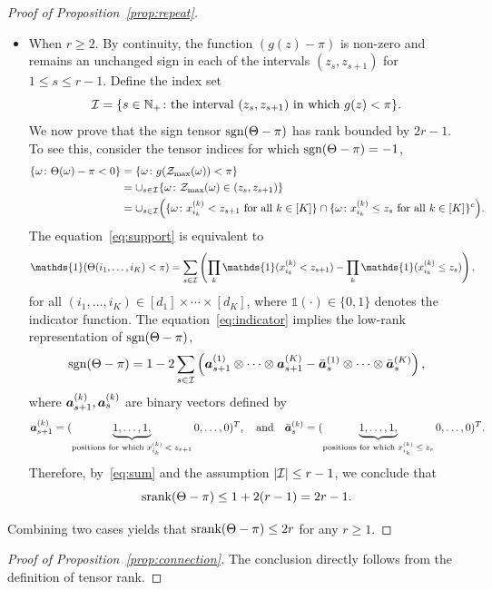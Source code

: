 \documentclass[twoside,11pt]{article}
\theoremstyle{plain}
\theoremstyle{definition}
\newcommand*{\KeepStyleUnderBrace}[1]{%
  \mathop{%
    \mathchoice
    {\underbrace{\displaystyle#1}}%
    {\underbrace{\textstyle#1}}%
    {\underbrace{\scriptstyle#1}}%
    {\underbrace{\scriptscriptstyle#1}}%
  }\limits
}
\def\sign{\textup{sgn}}
\def\srank{\textup{srank}}
\begin{document}
\begin{proof}[Proof of Proposition~\ref{prop:repeat}]
\begin{itemize}[leftmargin=*,topsep=0pt,itemsep=-1ex,partopsep=1ex,parsep=1ex]
\item When $r\geq 2$.   By continuity, the function $(g(z)-\pi)$ is non-zero and remains an unchanged sign in each of the intervals $(z_s, z_{s+1})$ for $1\leq s\leq r-1$. Define the index set 
\[
\mathcal{I}=\{s\in\mathbb{N}_{+}\colon \text{the interval $(z_s, z_{s+1})$ in which $g(z)<\pi$}\}.
\] 
We now prove that the sign tensor $\sign(\Theta-\pi)$ has rank bounded by $2r-1$. To see this, consider the tensor indices for which $\sign(\Theta-\pi)=-1$,
\begin{align}\label{eq:support}
\{\omega\colon \Theta(\omega)-\pi <0 \} & = \{\omega \colon g(\mathcal{Z}_{\max}(\omega))<\pi\} \notag \\
&=\cup_{s\in \mathcal{I}} \{\omega\colon \mathcal{Z}_{\max}(\omega)\in(z_s,z_{s+1})\}\notag\\
&=\cup_{s\in \mathcal{I}}\Big( \{\omega\colon \text{$x^{(k)}_{i_k}< z_{s+1}$ for all $k\in[K]$}\}\cap \{\omega\colon \text{$x^{(k)}_{i_k}\leq z_{s}$ for all $k\in[K]$}\}^c\Big).
\end{align}
The equation~\eqref{eq:support} is equivalent to 
\begin{align}\label{eq:indicator}
\mathds{1}(\Theta(i_1,\ldots,i_K)< \pi)&
=\sum_{s\in \tI}\left( \prod_k \mathds{1}(x^{(k)}_{i_k}< z_{s+1}) - \prod_k \mathds{1}(x^{(k)}_{i_k}\leq z_{s})\right),
\end{align}
for all $(i_1,\ldots,i_K)\in[d_1]\times \cdots\times[d_K]$, where $\mathds{1}(\cdot)\in\{0,1\}$ denotes the indicator function. The equation~\eqref{eq:indicator} implies the low-rank representation of $\sign(\Theta-\pi)$,
\begin{equation}\label{eq:sum}
\sign(\Theta-\pi)=1-2\sum_{s\in \tI } \left(\ma^{(1)}_{s+1}\otimes\cdots\otimes \ma^{(K)}_{s+1} - \bar \ma^{(1)}_s\otimes\cdots\otimes \bar \ma^{(K)}_s\right),
\end{equation}
where $\bm{a}^{(k)}_{s+1}, \bm{a}^{(k)}_{s}$ are binary vectors defined by
\[
\ma^{(k)}_{s+1}=(\KeepStyleUnderBrace{1,\ldots,1,}_{\text{positions for which $x_{i_k}^{(k)}<z_{s+1}$}}0,\ldots, 0)^T,\quad \text{and}\quad
\bar \ma^{(k)}_s=(\KeepStyleUnderBrace{1,\ldots,1,}_{\text{positions for which $x_{i_k}^{(k)}\leq z_{s}$}}0,\ldots, 0)^T.
\]
Therefore, by~\eqref{eq:sum} and the assumption $|\mathcal{I}|\leq r-1$, we conclude that 
\[
\srank(\Theta-\pi)\leq 1+2(r-1)=2r-1.
\]
\end{itemize}
Combining two cases yields that $\srank(\Theta-\pi)\leq 2r$ for any $r\geq 1$.
\end{proof}


\begin{proof}[Proof of Proposition~\ref{prop:connection}]
The conclusion directly follows from the definition of tensor rank. 
\end{proof}
\end{document}
